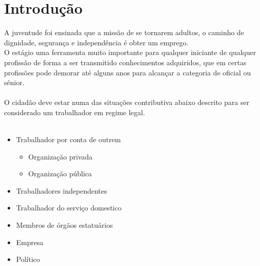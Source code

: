 \section{Introdução}
\qquad A juventude foi ensinada que a missão de se tornarem adultos, o caminho de dignidade, segurança e independência é obter um emprego.\cite{book_11}\\
O estágio uma ferramenta muito importante para qualquer iniciante de qualquer profissão de forma a ser transmitido conhecimentos adquiridos, que em certas profissões pode demorar até alguns anos para alcançar a categoria de oficial ou sénior.\\
\\
O cidadão deve estar numa das situações contributiva abaixo descrito para ser considerado um trabalhador em regime legal.\\
\\
\begin{minipage}[t]{\linewidth}
\begin{itemize}
\setlength\itemsep{-0.3em}
\item Trabalhador por conta de outrem
\begin{itemize}
\item Organização privada
\item Organização pública
\end{itemize}
\item Trabalhadores independentes
\newpage
\item Trabalhador do serviço domestico
\item Membros de órgãos estatuários
\item Empresa
\item Político\\ \\
\end{itemize}
\end{minipage}

